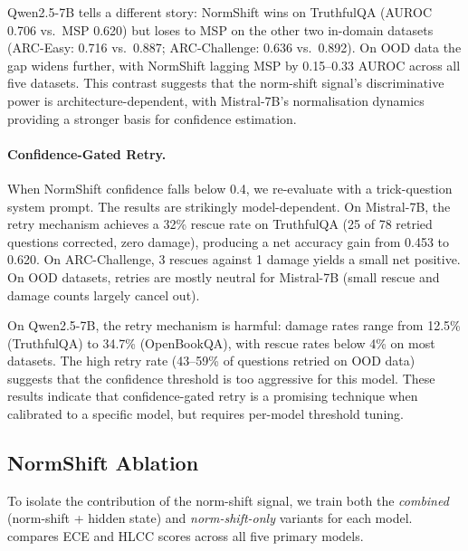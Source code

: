 \documentclass[11pt,a4paper]{article}
\begin{document}
Qwen2.5-7B tells a different story: NormShift wins on TruthfulQA
(AUROC 0.706 vs.\ MSP 0.620) but loses to MSP on the other two
in-domain datasets (ARC-Easy: 0.716 vs.\ 0.887; ARC-Challenge: 0.636
vs.\ 0.892).  On OOD data the gap widens further, with NormShift
lagging MSP by 0.15--0.33 AUROC across all five datasets.  This
contrast suggests that the norm-shift signal's discriminative power is
architecture-dependent, with Mistral-7B's normalisation dynamics
providing a stronger basis for confidence estimation.

\paragraph{Confidence-Gated Retry.}
When NormShift confidence falls below 0.4, we re-evaluate with a
trick-question system prompt.  The results are strikingly
model-dependent.  On Mistral-7B, the retry mechanism achieves a 32\%
rescue rate on TruthfulQA (25 of 78 retried questions corrected, zero
damage), producing a net accuracy gain from 0.453 to 0.620.  On
ARC-Challenge, 3 rescues against 1 damage yields a small net positive.
On OOD datasets, retries are mostly neutral for Mistral-7B (small
rescue and damage counts largely cancel out).

On Qwen2.5-7B, the retry mechanism is harmful: damage rates range from
12.5\% (TruthfulQA) to 34.7\% (OpenBookQA), with rescue rates below
4\% on most datasets.  The high retry rate (43--59\% of questions
retried on OOD data) suggests that the confidence threshold is too
aggressive for this model.  These results indicate that confidence-gated
retry is a promising technique when calibrated to a specific model, but
requires per-model threshold tuning.

\subsection{NormShift Ablation}
\label{sec:ablation}

To isolate the contribution of the norm-shift signal, we train both the
\emph{combined} (norm-shift + hidden state) and \emph{norm-shift-only}
variants for each model.   compares ECE and HLCC
scores across all five primary models.
\end{document}
